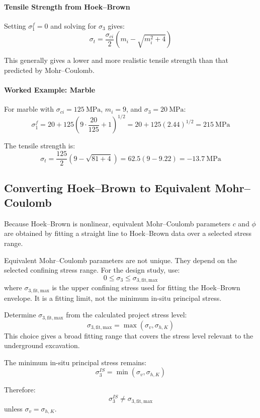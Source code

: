 \paragraph{Tensile Strength from Hoek--Brown}

Setting \(\sigma_1^f = 0\) and solving for \(\sigma_3\) gives:
\[
\sigma_t =
\frac{\sigma_{ci}}{2}
\left(
m_i - \sqrt{m_i^2+4}
\right)
\]

This generally gives a lower and more realistic tensile strength than that predicted by
Mohr--Coulomb.

\paragraph{Worked Example: Marble}

For marble with \(\sigma_{ci}=125~\text{MPa}\), \(m_i=9\), and \(\sigma_3=20~\text{MPa}\):
\[
\sigma_1^f =
20 + 125
\left(
9\cdot\frac{20}{125}+1
\right)^{1/2}
=
20 + 125(2.44)^{1/2}
=
215~\text{MPa}
\]

The tensile strength is:
\[
\sigma_t =
\frac{125}{2}
\left(
9-\sqrt{81+4}
\right)
=
62.5(9-9.22)
=
-13.7~\text{MPa}
\]

\subsection{Converting Hoek--Brown to Equivalent Mohr--Coulomb}

Because Hoek--Brown is nonlinear, equivalent Mohr--Coulomb parameters \(c\) and
\(\phi\) are obtained by fitting a straight line to Hoek--Brown data over a selected
stress range.

\begin{warnbox}
Equivalent Mohr--Coulomb parameters are not unique. They depend on the selected
confining stress range. For the design study, use:
\[
0 \leq \sigma_3 \leq \sigma_{3,\mathrm{fit,max}}
\]
where \(\sigma_{3,\mathrm{fit,max}}\) is the upper confining stress used for fitting the
Hoek--Brown envelope. It is a fitting limit, not the minimum in-situ principal stress.
\end{warnbox}

\begin{notebox}
Determine \(\sigma_{3,\mathrm{fit,max}}\) from the calculated project
stress level:
\[
\sigma_{3,\mathrm{fit,max}}=\max(\sigma_v,\sigma_{h,K})
\]
This choice gives a broad fitting range that covers the stress level relevant to the
underground excavation.

The minimum in-situ principal stress remains:
\[
\sigma_3^{IS}=\min(\sigma_v,\sigma_{h,K})
\]

Therefore:
\[
\sigma_3^{IS} \neq \sigma_{3,\mathrm{fit,max}}
\]
unless \(\sigma_v=\sigma_{h,K}\).
\end{notebox}

